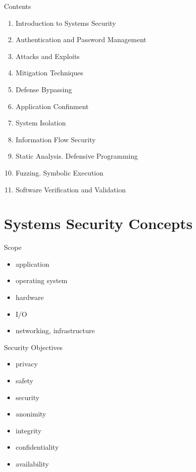 \documentclass{curs}
\begin{document}
\begin{frame}{Contents}
  \begin{enumerate}
    \item Introduction to Systems Security
    \item Authentication and Password Management
    \item Attacks and Exploits
    \item Mitigation Techniques
    \item Defense Bypassing
    \item Application Confinment
    \item System Isolation
    \item Information Flow Security
    \item Static Analysis. Defensive Programming
    \item Fuzzing. Symbolic Execution
    \item Software Verification and Validation
  \end{enumerate}
\end{frame}


\section{Systems Security Concepts}

\begin{frame}{Scope}
  \begin{itemize}
    \item application
    \item operating system
    \item hardware
    \item I/O
    \item networking, infrastructure
  \end{itemize}
\end{frame}

\begin{frame}{Security Objectives}
  \begin{itemize}
    \item privacy
    \item safety
    \item security
    \item anonimity
    \item integrity
    \item confidentiality
    \item availability
  \end{itemize}
\end{frame}
\end{document}

